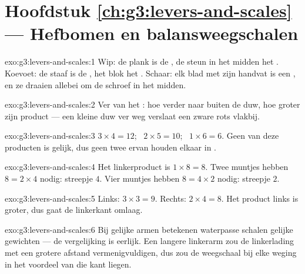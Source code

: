 \section*{Hoofdstuk \ref{ch:g3:levers-and-scales} --- Hefbomen en balansweegschalen}

\begin{solution}{exo:g3:levers-and-scales:1}
Wip: de plank is de , de steun in het midden het
. Koevoet: de staaf is de , het blok het
. Schaar: elk blad met zijn handvat is een , en ze
draaien allebei om de schroef in het midden.
\end{solution}

\begin{solution}{exo:g3:levers-and-scales:2}
Ver van het : hoe verder naar buiten de duw, hoe groter zijn
product --- een kleine duw ver weg verslaat een zware rots vlakbij.
\end{solution}

\begin{solution}{exo:g3:levers-and-scales:3}
$3 \times 4 = 12$; \ $2 \times 5 = 10$; \ $1 \times 6 = 6$. Geen van
deze producten is gelijk, dus geen twee ervan houden elkaar in
.
\end{solution}

\begin{solution}{exo:g3:levers-and-scales:4}
Het linkerproduct is $1 \times 8 = 8$. Twee muntjes hebben
$8 = 2 \times 4$ nodig: streepje $4$. Vier muntjes hebben
$8 = 4 \times 2$ nodig: streepje $2$.
\end{solution}

\begin{solution}{exo:g3:levers-and-scales:5}
Links: $3 \times 3 = 9$. Rechts: $2 \times 4 = 8$. Het product links
is groter, dus gaat de linkerkant omlaag.
\end{solution}

\begin{solution}{exo:g3:levers-and-scales:6}
Bij gelijke armen betekenen waterpasse schalen gelijke gewichten ---
de vergelijking is eerlijk. Een langere linkerarm zou de linkerlading
met een grotere afstand vermenigvuldigen, dus zou de weegschaal bij
elke weging in het voordeel van die kant liegen.
\end{solution}

